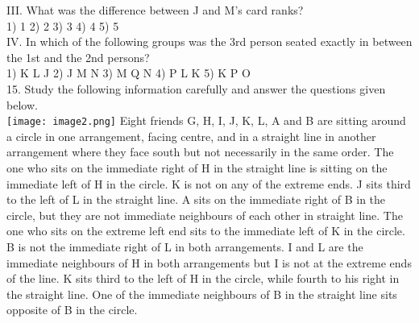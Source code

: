\documentclass[
]{article}
\begin{document}
III. What was the difference between J and M’s card ranks?\\
1) 1 \hspace{2mm}2) 2 \hspace{2mm}3) 3 \hspace{2mm}4) 4 \hspace{2mm}5) 5\\

IV. In which of the following groups was the 3rd person seated exactly in between the
1st and the 2nd persons?\\
1) K L J \hspace{2mm}2) J M N \hspace{2mm}3) M Q N \hspace{2mm}4) P L K \hspace{2mm}5) K P O\\

15. Study the following information carefully and answer the questions given below.\\
\texttt{[image: image2.png]}
Eight friends G, H, I, J, K, L, A and B are sitting around a circle in one arrangement, facing
centre, and in a straight line in another arrangement where they face south but not
necessarily in the same order. The one who sits on the immediate right of H in the straight
line is sitting on the immediate left of H in the circle. K is not on any of the extreme ends. J
sits third to the left of L in the straight line. A sits on the immediate right of B in the circle,
but they are not immediate neighbours of each other in straight line. The one who sits on the
extreme left end sits to the immediate left of K in the circle. B is not the immediate right of L
in both arrangements. I and L are the immediate neighbours of H in both arrangements but I
is not at the extreme ends of the line. K sits third to the left of H in the circle, while fourth to
his right in the straight line. One of the immediate neighbours of B in the straight line sits
opposite of B in the circle.\\
\end{document}
